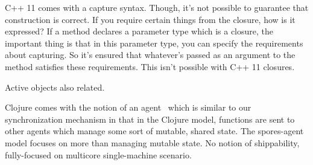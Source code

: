 \documentclass{llncs}
\begin{document}
C++ 11 comes with a capture syntax. Though, it's not possible to guarantee that construction is correct. If you require certain things from the closure, how is it expressed? If a method declares a parameter type which is a closure, the important thing is that in this parameter type, you can specify the requirements about capturing. So it's ensured that whatever's passed as an argument to the method satisfies these requirements. This isn't possible with C++ 11 closures. \cite{Cplusplus11Spec}

Active objects also related. \cite{ActiveObjects}

Clojure comes with the notion of an agent~\cite{Clojure} which is similar to our synchronization mechanism in that in the Clojure model, functions are sent to other agents which manage some sort of mutable, shared state. The spores-agent model focuses on more than managing mutable state. No notion of shippability, fully-focused on multicore single-machine scenario.



\end{document}

